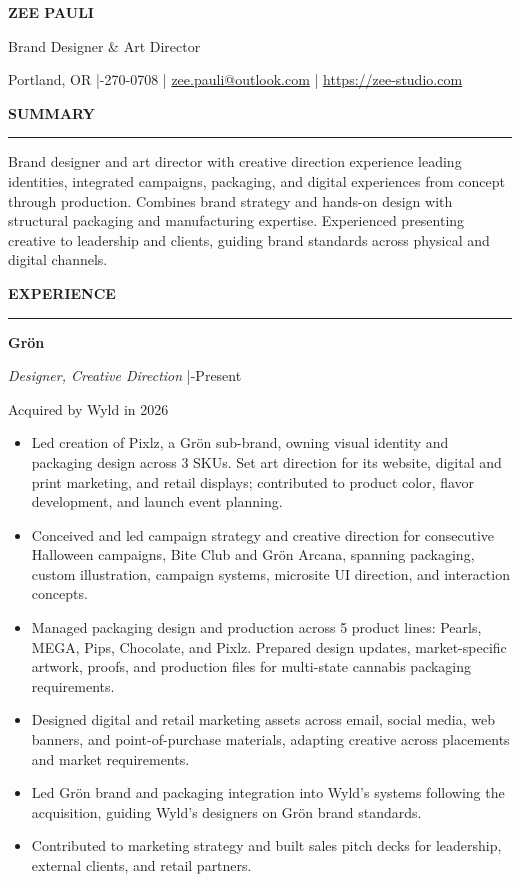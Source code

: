 \documentclass[10pt,letterpaper]{article}
\newcommand{\resumesection}[1]{%
  \vspace{4.5pt}%
  {\large\bfseries #1}\par
  \vspace{1pt}\hrule\vspace{2.5pt}%
}
\newcommand{\role}[3]{%
  {\bfseries #1}\par
  {\itshape #2} \enspace|\enspace #3\par
}
\begin{document}
{\fontsize{20}{22}\selectfont\bfseries ZEE PAULI}\par
\vspace{1pt}
{\large Brand Designer \& Art Director}\par
\vspace{2pt}
Portland, OR \enspace|-270-0708 \enspace|\enspace
\href{mailto:zee.pauli@outlook.com}{zee.pauli@outlook.com} \enspace|\enspace
\href{https://zee-studio.com}{https://zee-studio.com}

\resumesection{SUMMARY}
Brand designer and art director with creative direction experience leading identities,
integrated campaigns, packaging, and digital experiences from concept through production.
Combines brand strategy and hands-on design with structural packaging and manufacturing
expertise. Experienced presenting creative to leadership and clients, guiding brand
standards across physical and digital channels.

\resumesection{EXPERIENCE}
\role{Grön}{Designer, Creative Direction}{2024-Present}
Acquired by Wyld in 2026
\begin{itemize}
  \item Led creation of Pixlz, a Grön sub-brand, owning visual identity and packaging
    design across 3 SKUs. Set art direction for its website, digital and print marketing,
    and retail displays; contributed to product color, flavor development, and launch
    event planning.
  \item Conceived and led campaign strategy and creative direction for consecutive
    Halloween campaigns, Bite Club and Grön Arcana, spanning packaging, custom
    illustration, campaign systems, microsite UI direction, and interaction concepts.
  \item Managed packaging design and production across 5 product lines: Pearls, MEGA,
    Pips, Chocolate, and Pixlz. Prepared design updates, market-specific artwork,
    proofs, and production files for multi-state cannabis packaging requirements.
  \item Designed digital and retail marketing assets across email, social media, web
    banners, and point-of-purchase materials, adapting creative across placements and
    market requirements.
  \item Led Grön brand and packaging integration into Wyld's systems following the
    acquisition, guiding Wyld's designers on Grön brand standards.
  \item Contributed to marketing strategy and built sales pitch decks for leadership,
    external clients, and retail partners.
\end{itemize}
\end{document}

